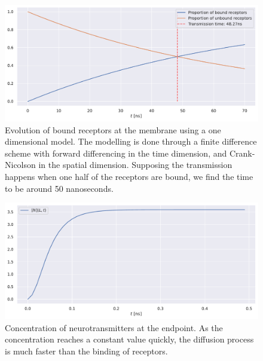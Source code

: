 \documentclass{article}
\begin{document}
\begin{figure}[tb]
        \centering
        \includegraphics[width=0.5\linewidth]{./code/figures/receptors.pdf}
        \caption{Evolution of bound receptors at the membrane using a one dimensional model. 
                The modelling is done through a finite difference scheme with forward differencing in the time dimension, and Crank-Nicolson in the spatial dimension. 
                Supposing the transmission happens when one half of the receptors are bound, we find the time to be around 50 nanoseconds.
        }
        \label{fig:receptors}
\end{figure}
\begin{figure}[tb]
        \centering
        \includegraphics[width=0.5\linewidth]{./code/figures/neurotransmitters.pdf}
        \caption{Concentration of neurotransmitters at the endpoint.
        As the concentration reaches a constant value quickly, the diffusion process is much faster than the binding of receptors.}
        \label{fig:neurotrans}
\end{figure}



\end{document}
